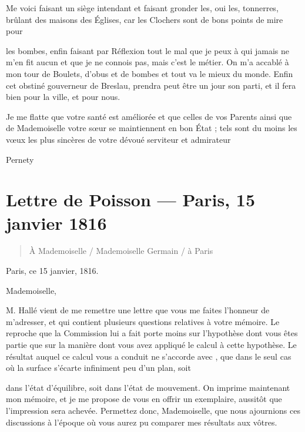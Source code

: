 \documentclass[11pt,a4paper]{article}
\begin{document}
Me voici faisant un siège intendant et faisant gronder les, oui les, tonnerres,
brûlant des maisons des Églises, car les Clochers sont de bons points de mire
pour

les bombes, enfin faisant par Réflexion tout le mal que je peux à qui jamais ne
m'en fit aucun et que je ne connois pas, mais c'est le métier. On m'a accablé à
mon tour de Boulets, d'obus et de bombes et tout va le mieux du monde. Enfin
cet obstiné gouverneur de Breslau, prendra peut être un jour son parti, et il
fera bien pour la ville, et pour nous.

Je me flatte que votre santé est améliorée et que celles de vos Parents ainsi
que de Mademoiselle votre sœur se maintiennent en bon État ; tels sont du moins
les vœux les plus sincères de votre dévoué serviteur et admirateur

Pernety

\section{Lettre de Poisson — Paris, 15 janvier 1816}


\begin{quote}
À Mademoiselle / Mademoiselle Germain / à Paris
\end{quote}

Paris, ce 15 janvier, 1816.

Mademoiselle,

M. Hallé vient de me remettre une lettre que vous me faites l'honneur de
m'adresser, et qui contient plusieurs questions relatives à votre mémoire. Le
reproche que la Commission lui a fait porte moins sur l'hypothèse dont vous
êtes partie que sur la manière dont vous avez appliqué le calcul à cette
hypothèse. Le résultat auquel ce calcul vous a conduit ne s'accorde avec
, que dans le seul cas où la surface s'écarte infiniment peu
d'un plan, soit

dans l'état d'équilibre, soit dans l'état de mouvement. On imprime maintenant
mon mémoire, et je me propose de vous en offrir un exemplaire, aussitôt que
l'impression sera achevée. Permettez donc, Mademoiselle, que nous ajournions
ces discussions à l'époque où vous aurez pu comparer mes résultats aux vôtres.
\end{document}
